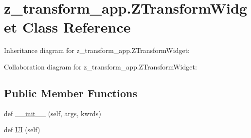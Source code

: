 \hypertarget{classz__transform__app_1_1ZTransformWidget}{}\section{z\+\_\+transform\+\_\+app.\+Z\+Transform\+Widget Class Reference}
\label{classz__transform__app_1_1ZTransformWidget}


Inheritance diagram for z\+\_\+transform\+\_\+app.\+Z\+Transform\+Widget\+:


Collaboration diagram for z\+\_\+transform\+\_\+app.\+Z\+Transform\+Widget\+:
\subsection*{Public Member Functions}
\begin{DoxyCompactItemize}
\item 
def \hyperlink{classz__transform__app_1_1ZTransformWidget_a1eb603db37e54d9dedcc3bffa8f56552}{\+\_\+\+\_\+init\+\_\+\+\_\+} (self, args, kwrds)
\item 
def \hyperlink{classz__transform__app_1_1ZTransformWidget_ad806831916f7d8246a281dbcc3ea58f7}{UI} (self)
\end{DoxyCompactItemize}
